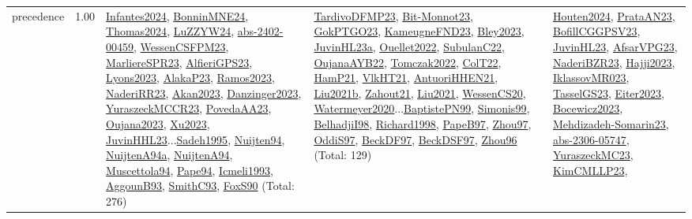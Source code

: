 {\begin{longtable}{p{3cm}r>{\raggedright\arraybackslash}p{6cm}>{\raggedright\arraybackslash}p{6cm}>{\raggedright\arraybackslash}p{8cm}}
\index{precedence}\index{Concepts!precedence}precedence &  1.00 & \hyperref[detail:Infantes2024]{Infantes2024}, \hyperref[detail:BonninMNE24]{BonninMNE24}, \hyperref[detail:Thomas2024]{Thomas2024}, \hyperref[detail:LuZZYW24]{LuZZYW24}, \hyperref[detail:abs-2402-00459]{abs-2402-00459}, \hyperref[detail:WessenCSFPM23]{WessenCSFPM23}, \hyperref[detail:MarliereSPR23]{MarliereSPR23}, \hyperref[detail:AlfieriGPS23]{AlfieriGPS23}, \hyperref[detail:Lyons2023]{Lyons2023}, \hyperref[detail:AlakaP23]{AlakaP23}, \hyperref[detail:Ramos2023]{Ramos2023}, \hyperref[detail:NaderiRR23]{NaderiRR23}, \hyperref[detail:Akan2023]{Akan2023}, \hyperref[detail:Danzinger2023]{Danzinger2023}, \hyperref[detail:YuraszeckMCCR23]{YuraszeckMCCR23}, \hyperref[detail:PovedaAA23]{PovedaAA23}, \hyperref[detail:Oujana2023]{Oujana2023}, \hyperref[detail:Xu2023]{Xu2023}, \hyperref[detail:JuvinHHL23]{JuvinHHL23}...\hyperref[detail:Sadeh1995]{Sadeh1995}, \hyperref[detail:Nuijten94]{Nuijten94}, \hyperref[detail:NuijtenA94a]{NuijtenA94a}, \hyperref[detail:NuijtenA94]{NuijtenA94}, \hyperref[detail:Muscettola94]{Muscettola94}, \hyperref[detail:Pape94]{Pape94}, \hyperref[detail:Icmeli1993]{Icmeli1993}, \hyperref[detail:AggounB93]{AggounB93}, \hyperref[detail:SmithC93]{SmithC93}, \hyperref[detail:FoxS90]{FoxS90} (Total: 276) & \hyperref[detail:TardivoDFMP23]{TardivoDFMP23}, \hyperref[detail:Bit-Monnot23]{Bit-Monnot23}, \hyperref[detail:GokPTGO23]{GokPTGO23}, \hyperref[detail:KameugneFND23]{KameugneFND23}, \hyperref[detail:Bley2023]{Bley2023}, \hyperref[detail:JuvinHL23a]{JuvinHL23a}, \hyperref[detail:Ouellet2022]{Ouellet2022}, \hyperref[detail:SubulanC22]{SubulanC22}, \hyperref[detail:OujanaAYB22]{OujanaAYB22}, \hyperref[detail:Tomczak2022]{Tomczak2022}, \hyperref[detail:ColT22]{ColT22}, \hyperref[detail:HamP21]{HamP21}, \hyperref[detail:VlkHT21]{VlkHT21}, \hyperref[detail:AntuoriHHEN21]{AntuoriHHEN21}, \hyperref[detail:Liu2021b]{Liu2021b}, \hyperref[detail:Zahout21]{Zahout21}, \hyperref[detail:Liu2021]{Liu2021}, \hyperref[detail:WessenCS20]{WessenCS20}, \hyperref[detail:Watermeyer2020]{Watermeyer2020}...\hyperref[detail:BaptistePN99]{BaptistePN99}, \hyperref[detail:Simonis99]{Simonis99}, \hyperref[detail:BelhadjiI98]{BelhadjiI98}, \hyperref[detail:Richard1998]{Richard1998}, \hyperref[detail:PapeB97]{PapeB97}, \hyperref[detail:Zhou97]{Zhou97}, \hyperref[detail:OddiS97]{OddiS97}, \hyperref[detail:BeckDF97]{BeckDF97}, \hyperref[detail:BeckDSF97]{BeckDSF97}, \hyperref[detail:Zhou96]{Zhou96} (Total: 129) & \hyperref[detail:Houten2024]{Houten2024}, \hyperref[detail:PrataAN23]{PrataAN23}, \hyperref[detail:BofillCGGPSV23]{BofillCGGPSV23}, \hyperref[detail:JuvinHL23]{JuvinHL23}, \hyperref[detail:AfsarVPG23]{AfsarVPG23}, \hyperref[detail:NaderiBZR23]{NaderiBZR23}, \hyperref[detail:Hajji2023]{Hajji2023}, \hyperref[detail:IklassovMR023]{IklassovMR023}, \hyperref[detail:TasselGS23]{TasselGS23}, \hyperref[detail:Eiter2023]{Eiter2023}, \hyperref[detail:Bocewicz2023]{Bocewicz2023}, \hyperref[detail:Mehdizadeh-Somarin23]{Mehdizadeh-Somarin23}, \hyperref[detail:abs-2306-05747]{abs-2306-05747}, \hyperref[detail:YuraszeckMC23]{YuraszeckMC23}, \hyperref[detail:KimCMLLP23]{KimCMLLP23}, 
\end{longtable}}
